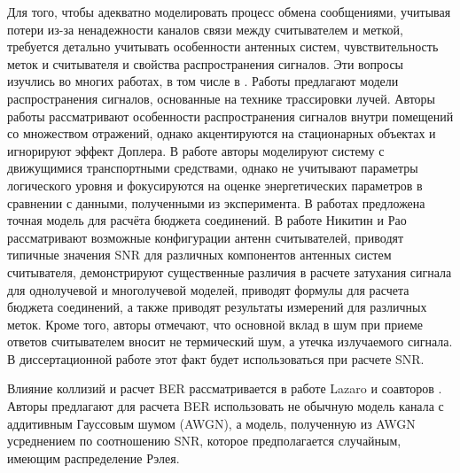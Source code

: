 Для того, чтобы адекватно моделировать процесс обмена сообщениями, учитывая потери из-за ненадежности каналов связи между считывателем и меткой, требуется детально учитывать особенности антенных систем, чувствительность меток и считывателя и свойства распространения сигналов. Эти вопросы изучлись во многих работах, в том числе в \cite{Dimitriou2014, Azpilicueta2016,  Griffin2009,  Nikitin2012, Nikitin2009, Nikitin2008, Nikitin2007, Nikitin2006, Nikitin2006a, Rao2005, Zanetti2010}. Работы \cite{Dimitriou2014, Azpilicueta2016} предлагают модели распространения сигналов, основанные на технике трассировки лучей. Авторы работы \cite{Dimitriou2014} рассматривают особенности распространения сигналов внутри помещений со множеством отражений, однако акцентируются на стационарных объектах и игнорируют эффект Доплера. В работе \cite{Azpilicueta2016} авторы моделируют систему с движущимися транспортными средствами, однако не учитывают параметры логического уровня и фокусируются на оценке энергетических параметров в сравнении с данными, полученными из эксперимента. В работах \cite{Nikitin2008, Griffin2009} предложена точная модель для расчёта бюджета соединений. В работе \cite{Nikitin2008} Никитин и Рао рассматривают возможные конфигурации антенн считывателей, приводят типичные значения SNR для различных компонентов антенных систем считывателя, демонстрируют существенные различия в расчете затухания сигнала для однолучевой и многолучевой моделей, приводят формулы для расчета бюджета соединений, а также приводят результаты измерений для различных меток. Кроме того, авторы отмечают, что основной вклад в шум при приеме ответов считывателем вносит не термический шум, а утечка излучаемого сигнала. В диссертационной работе этот факт будет использоваться при расчете SNR. 

Влияние коллизий и расчет BER рассматривается в работе Lazaro и соавторов \cite{Lazaro2009}. Авторы предлагают для расчета BER использовать не обычную модель канала с аддитивным Гауссовым шумом (AWGN), а модель, полученную из AWGN усреднением по соотношению SNR, которое предполагается случайным, имеющим распределение Рэлея.

